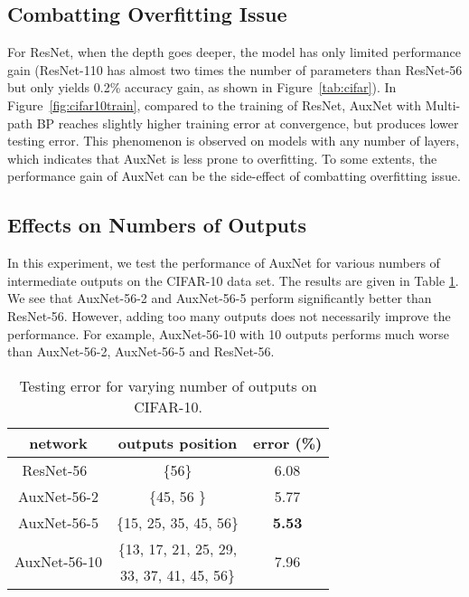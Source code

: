 \documentclass[10pt,onecolumn,letterpaper]{article}
\def\SexyName{AuxNet\xspace}
\begin{document}
\subsection{Combatting Overfitting Issue}


For ResNet, when the depth goes deeper, the model has only limited performance gain (\eg ResNet-110 has almost two times the number of parameters than ResNet-56 but only yields 0.2\% accuracy gain, as shown in Figure~\ref{tab:cifar}).  In Figure~\ref{fig:cifar10train}, compared to the training of ResNet, \SexyName with Multi-path BP reaches slightly higher training error at convergence, but produces lower testing error. This phenomenon is observed on models with any number of layers, which indicates that \SexyName is less prone to overfitting. To some extents, the performance gain of \SexyName can be the side-effect of combatting overfitting issue.


\subsection{Effects on Numbers of Outputs}\label{exp:num_outputs}
In this experiment, we test the performance of \SexyName for various numbers of intermediate outputs on the CIFAR-10 data set.
The results are given in Table \ref{tab:num_outputs}. We see that
\SexyName-56-2 and \SexyName-56-5 perform significantly better than ResNet-56.
However, adding too many outputs does not necessarily improve the performance. For example,  \SexyName-56-10 with 10 outputs performs much worse than  \SexyName-56-2, \SexyName-56-5 and ResNet-56.

\begin{table}[h]
  \centering
  \caption{Testing error for varying number of outputs on CIFAR-10.}
    \begin{tabular}{c|c|c}
    \hline
    network & outputs position & error (\%) \\
    \hline
    ResNet-56~\cite{he2016identity}     & \{56\}  & 6.08 \\
    \SexyName-56-2      & \{45, 56 \} & 5.77 \\
    \SexyName-56-5      & \{15, 25, 35, 45, 56\} & \textbf{5.53} \\
    \hline
    \multirow{2}{*}{\SexyName-56-10}
    & \{13, 17, 21, 25, 29,&
    \multirow{2}{*}{7.96}\\
    & 33, 37, 41, 45, 56\} & \\

    \hline
    \end{tabular}
  \label{tab:num_outputs}%
\end{table}%
\end{document}

